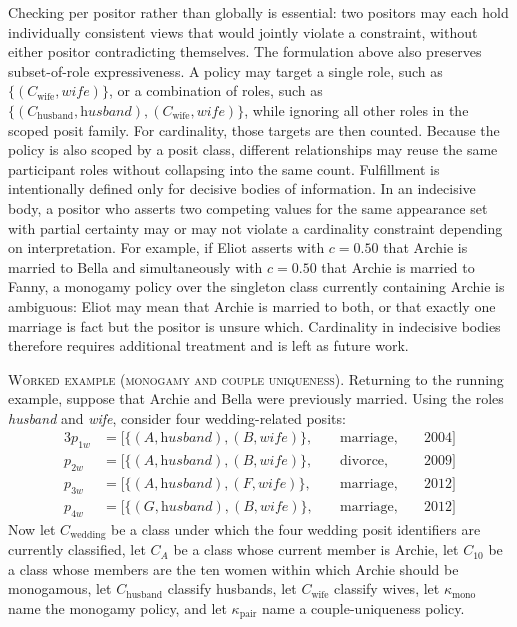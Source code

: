 \documentclass[a4paper,fleqn]{cas-sc}
\begin{document}
Checking per positor rather than globally is essential: two positors may each hold individually consistent views that would jointly violate a constraint, without either positor contradicting themselves. The formulation above also preserves subset-of-role expressiveness. A policy may target a single role, such as \(\{(C_{\mathrm{wife}},\textit{wife})\}\), or a combination of roles, such as \(\{(C_{\mathrm{husband}},\textit{husband}), (C_{\mathrm{wife}},\textit{wife})\}\), while ignoring all other roles in the scoped posit family. For cardinality, those targets are then counted. Because the policy is also scoped by a posit class, different relationships may reuse the same participant roles without collapsing into the same count. Fulfillment is intentionally defined only for decisive bodies of information. In an indecisive body, a positor who asserts two competing values for the same appearance set with partial certainty may or may not violate a cardinality constraint depending on interpretation. For example, if Eliot asserts with \(c = 0.50\) that Archie is married to Bella and simultaneously with \(c = 0.50\) that Archie is married to Fanny, a monogamy policy over the singleton class currently containing Archie is ambiguous: Eliot may mean that Archie is married to both, or that exactly one marriage is fact but the positor is unsure which. Cardinality in indecisive bodies therefore requires additional treatment and is left as future work.

\textsc{Worked example (monogamy and couple uniqueness).} Returning to the running example, suppose that Archie and Bella were previously married. Using the roles \textit{husband} and \textit{wife}, consider four wedding-related posits:
\begin{alignat*}{3}
p_{1w} &= [\{(A, \textit{husband}), (B, \textit{wife})\},\;&& \textrm{marriage},\;&& \textrm{2004}] \\
p_{2w} &= [\{(A, \textit{husband}), (B, \textit{wife})\},\;&& \textrm{divorce},\;&& \textrm{2009}] \\
p_{3w} &= [\{(A, \textit{husband}), (F, \textit{wife})\},\;&& \textrm{marriage},\;&& \textrm{2012}] \\
p_{4w} &= [\{(G, \textit{husband}), (B, \textit{wife})\},\;&& \textrm{marriage},\;&& \textrm{2012}]
\end{alignat*}
Now let \(C_{\mathrm{wedding}}\) be a class under which the four wedding posit identifiers are currently classified, let \(C_{A}\) be a class whose current member is Archie, let \(C_{10}\) be a class whose members are the ten women within which Archie should be monogamous, let \(C_{\mathrm{husband}}\) classify husbands, let \(C_{\mathrm{wife}}\) classify wives, let \(\kappa_{\mathrm{mono}}\) name the monogamy policy, and let \(\kappa_{\mathrm{pair}}\) name a couple-uniqueness policy.
\end{document}
